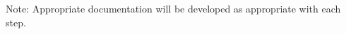 \documentclass [12pt]{article}
\begin{document}
 Note: Appropriate documentation will be developed as appropriate with each step.

%
%
%
%
%
%
%

\end{document}
